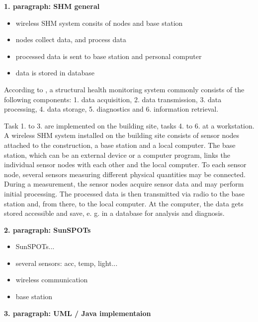 \documentclass[12pt]{scrartcl}
\begin{document}
\textbf{1. paragraph: SHM general}

\begin{itemize}
\item wireless SHM system consits of nodes and base station
\item nodes collect data, and process data
\item processed data is sent to base station and personal computer
\item data is stored in database
\end{itemize}


According to \cite[5]{BisbySHM}, a structural health monitoring system commonly consists of the following components:
1. data acquisition,
2. data transmission, 
3. data processing,
4. data storage,
5. diagnostics and 
6. information retrieval.

Task 1. to 3. are implemented on the building site, tasks 4. to 6. at a workstation. 
A wireless SHM system installed on the building site consists of sensor nodes attached to the construction, a base station and a local computer. 
The base station, which can be an external device or a computer program, links the individual sensor nodes with each other and the local computer.
To each sensor node, several sensors measuring different physical quantities may be connected. 
During a measurement, the sensor nodes acquire sensor data and may perform initial processing.
The processed data is then transmitted via radio to the base station and, from there, to the local computer. 
At the computer, the data gets stored accessible and save, e. g. in a database for analysis and diagnosis.



\textbf{2. paragraph: SunSPOTs}

\begin{itemize}
\item SunSPOTs...
\item several sensors: acc, temp, light...
\item wireless communication
\item base station
\end{itemize}



\textbf{3. paragraph: UML / Java implementaion}
\end{document}
